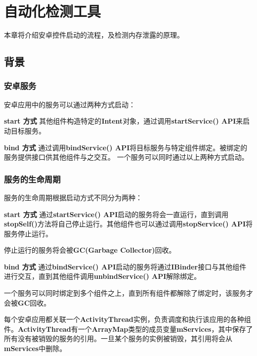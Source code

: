 \documentclass[winfonts]{njuthesis}
\begin{document}
\chapter{自动化检测工具}\label{chapter_system}

本章将介绍安卓控件启动的流程，及检测内存泄露的原理。

\section{背景}
\subsection{安卓服务}
安卓应用中的服务可以通过两种方式启动\cite{service}：

\textbf{start 方式 } 其他组件构造特定的\textbf{Intent}对象，通过调用\textbf{startService() API}来启动目标服务。

\textbf{bind 方式 } 通过调用\textbf{bindService() API}将目标服务与特定组件绑定。被绑定的服务提供接口供其他组件与之交互。
一个服务可以同时通过以上两种方式启动。

\subsection{服务的生命周期}
服务的生命周期根据启动方式不同分为两种\cite{service}：

\textbf{start 方式 } 通过\textbf{startService() API}启动的服务将会一直运行，直到调用\textbf{stopSelf()}方法将自己停止运行。其他组件也可以通过调用\textbf{stopService() API}将服务停止运行。

停止运行的服务将会被\textbf{GC(Garbage Collector)}回收。

\textbf{bind 方式 } 通过\textbf{bindService() API}启动的服务将通过\textbf{IBinder}接口与其他组件进行交互，直到其他组件调用\textbf{unbindService() API}解除绑定。

一个服务可以同时绑定到多个组件之上，直到所有组件都解除了绑定时，该服务才会被\textbf{GC}回收。

每个安卓应用都关联一个\textbf{ActivityThread}实例，负责调度和执行该应用的各种组件。\textbf{ActivityThread}有一个\textbf{ArrayMap}类型的成员变量\textbf{mServices}，其中保存了所有没有被销毁的服务的引用。一旦某个服务的实例被销毁，其引用将会从\textbf{mServices}中删除。
\end{document}
